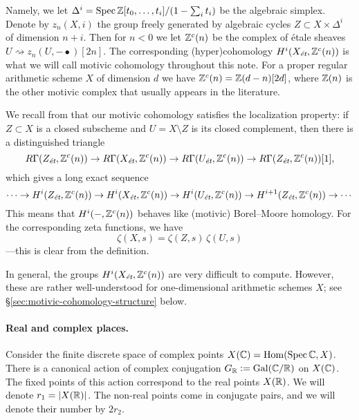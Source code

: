 \documentclass{article}
\numberwithin{equation}{section}
\begin{document}
Namely, we let $\Delta^i = \Spec \ZZ [t_0,\ldots,t_i] / (1 - \sum_i t_i)$ be the
algebraic simplex. Denote by $z_n (X, i)$ the group freely generated by
algebraic cycles $Z \subset X \times \Delta^i$ of dimension $n+i$. Then for
$n < 0$ we let $\ZZ^c (n)$ be the complex of étale sheaves
$U \rightsquigarrow z_n (U, -\bullet) [2n]$. The corresponding (hyper)cohomology
$H^i (X_\et, \ZZ^c (n))$ is what we will call motivic cohomology throughout this
note. For a proper regular arithmetic scheme $X$ of dimension $d$ we have
$\ZZ^c (n) = \ZZ (d-n) [2d]$, where $\ZZ (n)$ is the other motivic complex that
usually appears in the literature.

We recall from \cite[Corollary~7.2]{Geisser-2010} that our motivic cohomology
satisfies the localization property: if $Z \subset X$ is a closed subscheme and
$U = X\setminus Z$ is its closed complement, then there is a distinguished
triangle
\[ R\Gamma (Z_\et, \ZZ^c (n)) \to
  R\Gamma (X_\et, \ZZ^c (n)) \to
  R\Gamma (U_\et, \ZZ^c (n)) \to 
  R\Gamma (Z_\et, \ZZ^c (n)) [1], \]
which gives a long exact sequence
\begin{equation}
  \label{eqn:localization-les}
  \cdots \to H^i (Z_\et, \ZZ^c (n)) \to
  H^i (X_\et, \ZZ^c (n)) \to
  H^i (U_\et, \ZZ^c (n)) \to 
  H^{i+1} (Z_\et, \ZZ^c (n)) \to \cdots
\end{equation}
This means that $H^i (-, \ZZ^c (n))$ behaves like (motivic) Borel--Moore
homology. For the corresponding zeta functions, we have
$$\zeta (X,s) = \zeta (Z,s)\,\zeta (U,s)$$
---this is clear from the definition.

In general, the groups $H^i (X_\et, \ZZ^c (n))$ are very difficult to
compute. However, these are rather well-understood for one-dimensional
arithmetic schemes $X$; see \S\ref{sec:motivic-cohomology-structure} below.

\paragraph{Real and complex places.}
Consider the finite discrete space of complex points
$X (\CC) = \Hom (\Spec \CC, X)$. There is a canonical action of complex
conjugation $G_\RR \dfn \Gal (\CC/\RR)$ on $X (\CC)$. The fixed points of this
action correspond to the real points $X (\RR)$. We will denote
$r_1 = |X (\RR)|$. The non-real points come in conjugate pairs, and we will
denote their number by $2 r_2$.
\end{document}
